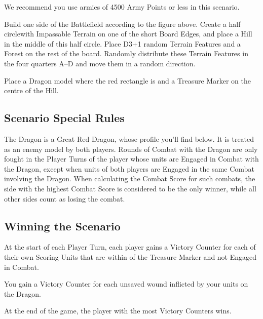 We recommend you use armies of 4500 Army Points or less in this scenario.

Build one side of the Battlefield according to the figure above. Create a half circlewith Impassable Terrain on one of the short Board Edges, and place a Hill in the middle of this half circle. Place D3+1 random Terrain Features and a Forest on the rest of the board. Randomly distribute these Terrain Features in the four quarters A--D and move them  in a random direction. 

Place a Dragon model where the red rectangle is and a Treasure Marker on the centre of the Hill.

\subsection*{Scenario Special Rules}

The Dragon is a Great Red Dragon, whose profile you'll find below. It is treated as an enemy model by both players. Rounds of Combat with the Dragon are only fought in the Player Turns of the player whose units are Engaged in Combat with the Dragon, except when units of both players are Engaged in the same Combat involving the Dragon. When calculating the Combat Score for such combats, the side with the highest Combat Score is considered to be the only winner, while all other sides count as losing the combat.



\subsection*{Winning the Scenario}

At the start of each Player Turn, each player gains a Victory Counter for each of their own Scoring Units that are within  of the Treasure Marker and not Engaged in Combat.

You gain a Victory Counter for each unsaved wound inflicted by your units on the Dragon.

At the end of the game, the player with the most Victory Counters wins. 
